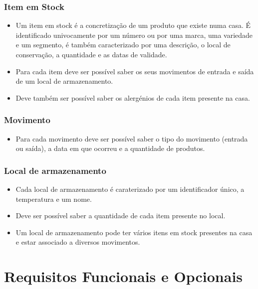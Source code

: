 \subsubsection{Item em Stock}
\begin{itemize}
	\item Um item em stock é a concretização de um produto que existe numa casa. É identificado univocamente por um número ou por uma marca, uma variedade e um segmento, é também caracterizado por uma descrição, o local de conservação, a quantidade e as datas de validade. 
	\item Para cada item deve ser possível saber os seus movimentos de entrada e saída de um local de armazenamento.
	\item Deve também ser possível saber os alergénios de cada item presente na casa.
\end{itemize}

\subsubsection{Movimento}
\begin{itemize}
	\item Para cada movimento deve ser possível saber o tipo do movimento (entrada ou saída), a data em que ocorreu e a quantidade de produtos. 
\end{itemize}

\subsubsection{Local de armazenamento}
\begin{itemize}
	\item Cada local de armazenamento é caraterizado por um identificador único, a temperatura e um nome.
	\item Deve ser possível saber a quantidade de cada item presente no local.
	\item Um local de armazenamento pode ter vários itens em stock presentes na casa e estar associado a diversos movimentos.
\end{itemize}


%
%
\section{Requisitos Funcionais e Opcionais} \label{sec22}

